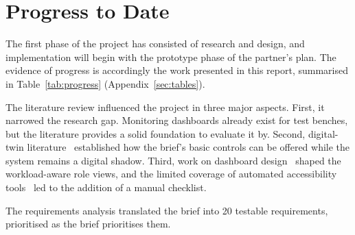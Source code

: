 \section{Progress to Date}
\label{sec:implementation}

The first phase of the project has consisted of research and design, and implementation will begin with the prototype phase of the partner's plan.
The evidence of progress is accordingly the work presented in this report, summarised in Table~\ref{tab:progress} (Appendix~\ref{sec:tables}).

The literature review influenced the project in three major aspects.
First, it narrowed the research gap.
Monitoring dashboards already exist for test benches, but the literature provides a solid foundation to evaluate it by.
Second, digital-twin literature~\cite{kritzinger2018digital,jones2020characterising} established how the brief's basic controls can be offered while the system remains a digital shadow.
Third, work on dashboard design~\cite{bach2023dashboard,tractinsky2000beautiful} shaped the workload-aware role views, and the limited coverage of automated accessibility tools~\cite{vigo2013benchmarking} led to the addition of a manual checklist.

The requirements analysis translated the brief into 20 testable requirements, prioritised as the brief prioritises them.
